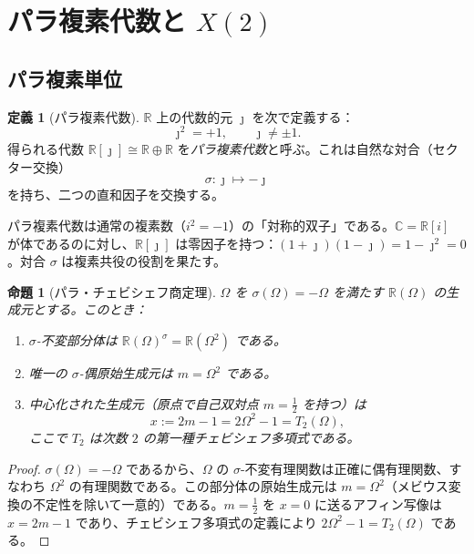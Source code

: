 \documentclass[12pt]{article}
\theoremstyle{plain}
\newtheorem{proposition}[theorem]{命題}
\theoremstyle{definition}
\newtheorem{definition}[theorem]{定義}
\numberwithin{equation}{section}
\newcommand{\R}{\mathbb{R}}
\newcommand{\C}{\mathbb{C}}
\begin{document}
\section{パラ複素代数と $X(2)$}

\subsection{パラ複素単位}

\begin{definition}[パラ複素代数]
$\R$ 上の代数的元 $\jmath$ を次で定義する：
\begin{equation}
\jmath^2 = +1, \qquad \jmath \neq \pm 1.
\end{equation}
得られる代数 $\R[\jmath]\cong\R\oplus\R$ を\emph{パラ複素代数}と呼ぶ。これは自然な対合（セクター交換）
\begin{equation}
\sigma: \jmath \mapsto -\jmath
\end{equation}
を持ち、二つの直和因子を交換する。
\end{definition}

パラ複素代数は通常の複素数（$i^2=-1$）の「対称的双子」である。$\C=\R[i]$ が体であるのに対し、$\R[\jmath]$ は零因子を持つ：$(1+\jmath)(1-\jmath)=1-\jmath^2=0$。対合 $\sigma$ は複素共役の役割を果たす。

\begin{proposition}[パラ・チェビシェフ商定理]\label{prop:parachebyshev}
$\Omega$ を $\sigma(\Omega)=-\Omega$ を満たす $\R(\Omega)$ の生成元とする。このとき：
\begin{enumerate}[label=(\roman*)]
\item $\sigma$-不変部分体は $\R(\Omega)^\sigma=\R(\Omega^2)$ である。
\item 唯一の $\sigma$-偶原始生成元は $m=\Omega^2$ である。
\item 中心化された生成元（原点で自己双対点 $m=\frac{1}{2}$ を持つ）は
\begin{equation}
\boxed{x := 2m-1 = 2\Omega^2 - 1 = T_2(\Omega),}
\end{equation}
ここで $T_2$ は次数 $2$ の第一種チェビシェフ多項式である。
\end{enumerate}
\end{proposition}

\begin{proof}
$\sigma(\Omega)=-\Omega$ であるから、$\Omega$ の $\sigma$-不変有理関数は正確に偶有理関数、すなわち $\Omega^2$ の有理関数である。この部分体の原始生成元は $m=\Omega^2$（メビウス変換の不定性を除いて一意的）である。$m=\frac{1}{2}$ を $x=0$ に送るアフィン写像は $x=2m-1$ であり、チェビシェフ多項式の定義により $2\Omega^2-1=T_2(\Omega)$ である。
\end{proof}
\end{document}
